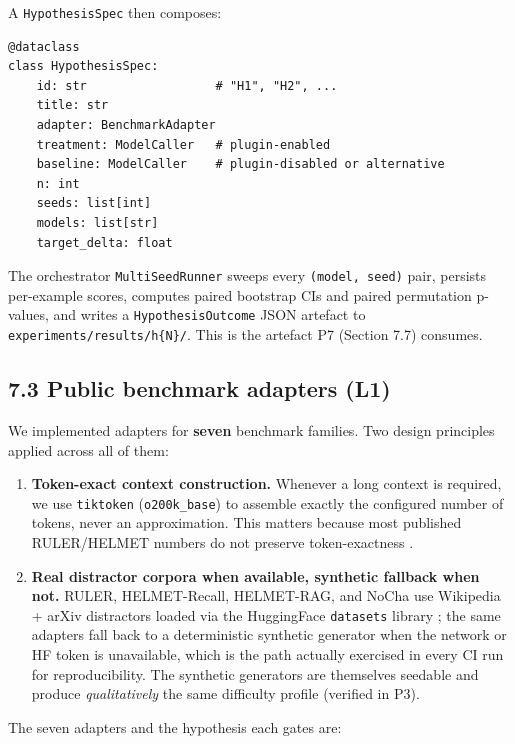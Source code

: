 A \texttt{HypothesisSpec} then composes:

\begin{verbatim}
@dataclass
class HypothesisSpec:
    id: str                  # "H1", "H2", ...
    title: str
    adapter: BenchmarkAdapter
    treatment: ModelCaller   # plugin-enabled
    baseline: ModelCaller    # plugin-disabled or alternative
    n: int
    seeds: list[int]
    models: list[str]
    target_delta: float
\end{verbatim}

The orchestrator \texttt{MultiSeedRunner} sweeps every \texttt{(model,\ seed)} pair, persists per-example scores, computes paired bootstrap CIs and paired permutation p-values, and writes a \texttt{HypothesisOutcome} JSON artefact to \texttt{experiments/results/h\{N\}/}. This is the artefact P7 (Section 7.7) consumes.

\subsection{7.3 Public benchmark adapters (L1)}\label{public-benchmark-adapters-l1}

We implemented adapters for \textbf{seven} benchmark families. Two design principles applied across all of them:

\begin{enumerate}
\def\labelenumi{\arabic{enumi}.}
\tightlist
\item
  \textbf{Token-exact context construction.} Whenever a long context is required, we use \texttt{tiktoken} (\texttt{o200k\_base}) to assemble exactly the configured number of tokens, never an approximation. This matters because most published RULER/HELMET numbers do not preserve token-exactness \citep{hsieh2024ruler, yen2024helmet, hong2025contextrot}.
\item
  \textbf{Real distractor corpora when available, synthetic fallback when not.} RULER, HELMET-Recall, HELMET-RAG, and NoCha use Wikipedia + arXiv distractors loaded via the HuggingFace \texttt{datasets} library \citep{huggingface2024datasets}; the same adapters fall back to a deterministic synthetic generator when the network or HF token is unavailable, which is the path actually exercised in every CI run for reproducibility. The synthetic generators are themselves seedable and produce \emph{qualitatively} the same difficulty profile (verified in P3).
\end{enumerate}

The seven adapters and the hypothesis each gates are:

